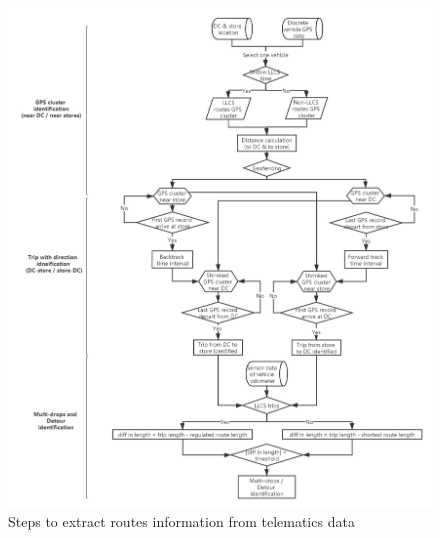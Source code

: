 \documentclass[preprint,12pt,3p]{elsarticle}
\begin{document}
\begin{figure}[H] %
\centering %
\includegraphics[width=1\textwidth]{OD pair identification.png} %
\caption{Steps to extract routes information from telematics data} %
\label{Fig1} %
\end{figure}




\clearpage

\end{document}
